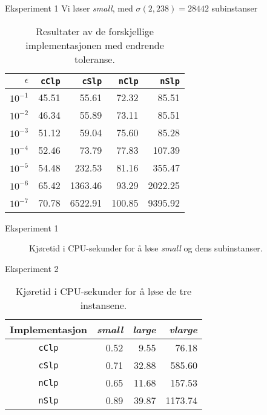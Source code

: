 \documentclass{beamer}
\begin{document}
\begin{frame}{Eksperiment 1}
Vi løser \textit{small}, med $\sigma(2, 238) = 28 442$ subinstanser
\begin{table}[ht!]
\centering
\caption{Resultater av de forskjellige implementasjonen med endrende toleranse.}
\begin{tabular}{rrrrr}
$\epsilon$ & \texttt{cClp} & \texttt{cSlp} & \texttt{nClp} & \texttt{nSlp} \\ \hline
$10^{-1}$ & 45.51 & 55.61 & 72.32 & 85.51 \\
$10^{-2}$ & 46.34 & 55.89 & 73.11 & 85.51 \\
$10^{-3}$ & 51.12 & 59.04 & 75.60 & 85.28 \\
$10^{-4}$ & 52.46 & 73.79 & 77.83 & 107.39 \\
$10^{-5}$ & 54.48 & 232.53 & 81.16 & 355.47 \\
$10^{-6}$ & 65.42 & 1363.46 & 93.29 & 2022.25 \\
$10^{-7}$ & 70.78 & 6522.91 & 100.85 & 9395.92
\end{tabular}
\label{table:expone}
\end{table}
\end{frame}



\begin{frame}{Eksperiment 1}
\begin{figure}[ht!]
    \centering
    
    \caption{Kjøretid i CPU-sekunder for å løse \textit{small} og dens subinstanser.}
    \label{fig:smalltolerance}
\end{figure}
\end{frame}



\begin{frame}{Eksperiment 2}
\begin{table}
\centering
\caption{Kjøretid i CPU-sekunder for å løse de tre instansene.}
\label{table:eps4instances}
\begin{tabular}{crrr}
\textrm{Implementasjon} & \textit{small} & \textit{large} & \textit{vlarge} \\ \hline
\texttt{cClp}           & 0.52           & 9.55           & 76.18 \\
\texttt{cSlp}           & 0.71           & 32.88          & 585.60 \\
\texttt{nClp}           & 0.65           & 11.68          & 157.53 \\
\texttt{nSlp}           & 0.89           & 39.87          & 1173.74
\end{tabular}
\end{table}
\end{frame}
\end{document}
